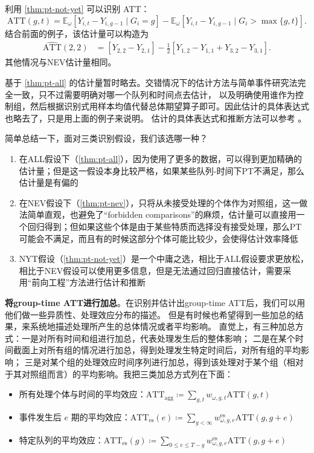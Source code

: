 \documentclass[../didNotes.tex]{subfiles}
\begin{document}
利用 \autoref{thm:pt-not-yet} 可以识别 ATT：
\[
  \text{ATT}(g,t) = \mathbb{E}_{\omega}[Y_{i,t}-Y_{i,g-1} \mid G_i=g] -
  \mathbb{E}_{\omega}[Y_{i,t}-Y_{i,g-1} \mid G_i > \max \{g,t\} ]
.\]
结合前面的例子，该估计量可以构造为
\begin{align*}
  \widehat{\text{ATT}}(2,2) & = [Y_{2,2}-Y_{2,1}] - \frac{1}{2} [Y_{1,2}-Y_{1,1} +
  Y_{3,2}-Y_{3,1}].
\end{align*}
其他情况与NEV估计量相同。

基于 \autoref{thm:pt-all} 的估计量暂时略去。交错情况下的估计方法与简单事件研究法完全一致，只不过需要明确对哪一个队列和时间点去估计，
以及明确使用谁作为控制组，然后根据识别式用样本均值代替总体期望算子即可。因此估计的具体表达式也略去了，只是用上面的例子来说明。
估计的具体表达式和推断方法可以参考 \textcite{callaway2021}。

简单总结一下，面对三类识别假设，我们该选哪一种？
\begin{enumerate}
  \item 在ALL假设下（\autoref{thm:pt-all}），因为使用了更多的数据，可以得到更加精确的估计量；但是这一假设本身比较严格，如果某些队列-时间下PT不满足，那么估计量是有偏的
  \item 在NEV假设下（\autoref{thm:pt-nev}），只将从未接受处理的个体作为对照组，这一做法简单直观，也避免了``forbidden
    comparisons''的麻烦，估计量可以直接用一个回归得到；但如果这些个体是由于某些特质而选择没有接受处理，那么PT可能会不满足，而且有的时候这部分个体可能比较少，会使得估计效率降低
  \item NYT假设（\autoref{thm:pt-not-yet}）是一个中庸之选，相比于ALL假设要求更放松，相比于NEV假设可以使用更多信息，但是无法通过回归直接估计，需要采用``前向工程''方法进行估计和推断
\end{enumerate}

\textbf{将group-time ATT进行加总}。在识别并估计出group-time ATT后，我们可以用他们做一些异质性、处理效应分布的描述。
但是有时候也希望得到一些加总的结果，来系统地描述处理所产生的总体情况或者平均影响。
直觉上，有三种加总方式：一是对所有时间和组进行加总，代表处理发生后的整体影响；
二是在某个时间截面上对所有组的情况进行加总，得到处理发生特定时间后，对所有组的平均影响；
三是对某个组的处理效应时间序列进行加总，得到该处理对于某个组（相对于其对照组而言）的平均影响。我把三类加总方式列在下面：
\begin{itemize}
  \item 所有处理个体与时间的平均效应：\( \text{ATT}_{\text{agg}}
    \coloneqq \sum_{g,t} w_{\omega, g,t} \text{ATT}(g,t) \)
  \item 事件发生后 \( e \) 期的平均效应：\(
      \text{ATT}_{\text{es}}(e) \coloneqq \sum_{g < \infty} w^{\text{es}}_{\omega, g, e}
    \text{ATT}(g,g+e)  \)
  \item 特定队列的平均效应：\( \text{ATT}_{\text{es}}(g) \coloneqq
    \sum_{0 \le e \le T-g} w^{\text{es}}_{\omega, g, e} \text{ATT}(g,g+e)  \)
\end{itemize}
\end{document}
